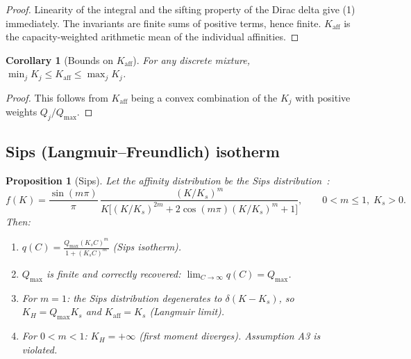 \documentclass[12pt]{article}
\newtheorem{proposition}{Proposition}
\newtheorem{corollary}{Corollary}
\begin{document}
\begin{proof}
Linearity of the integral and the sifting property of the
Dirac delta give (1) immediately.  The invariants are finite sums
of positive terms, hence finite.  $K_{\mathrm{aff}}$ is the
capacity-weighted arithmetic mean of the individual affinities.
\end{proof}

\begin{corollary}[Bounds on $K_{\mathrm{aff}}$]
\label{cor:bounds}
For any discrete mixture,
$\min_j K_j \le K_{\mathrm{aff}} \le \max_j K_j$.
\end{corollary}

\begin{proof}
This follows from $K_{\mathrm{aff}}$ being a convex combination
of the $K_j$ with positive weights $Q_j/Q_{\max}$.
\end{proof}

\subsection{Sips (Langmuir--Freundlich) isotherm}

\begin{proposition}[Sips]
\label{prop:sips}
Let the affinity distribution be the Sips
distribution~\cite{Sips1948}:
\begin{equation}
  f(K) = \frac{\sin(m\pi)}{\pi}\,
  \frac{(K/K_s)^{m}}
       {K\bigl[(K/K_s)^{2m}+2\cos(m\pi)(K/K_s)^{m}+1\bigr]},
  \qquad 0<m\le 1,\; K_s>0.
  \label{eq:sips_dist}
\end{equation}
Then:
\begin{enumerate}[nosep]
  \item $q(C) = \displaystyle\frac{Q_{\max}(K_s C)^m}
        {1+(K_s C)^m}$
        \quad (Sips isotherm).
  \item $Q_{\max}$ is finite and correctly recovered:
        $\lim_{C\to\infty}q(C)=Q_{\max}$.
  \item For $m=1$: the Sips distribution degenerates to
        $\delta(K-K_s)$, so $K_H=Q_{\max}K_s$ and
        $K_{\mathrm{aff}}=K_s$ (Langmuir limit).
  \item For $0<m<1$: $K_H=+\infty$ (first moment diverges).
        Assumption A3 is violated.
\end{enumerate}
\end{proposition}
\end{document}
